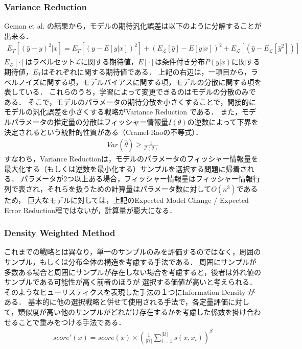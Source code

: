 \subsubsection{Variance Reduction \cite{cohn1994improving}}
Geman et al. \cite{geman2008neural}の結果から，モデルの期待汎化誤差は以下のように分解することが出来る．
\begin{eqnarray}
    E_T [(\hat{y} - y)^2|x] = E_T [(y - E[y|x])^2] + (E_{\mathcal{L}}[\hat{y}] - E[y|x])^2 + E_{\mathcal{L}} [(\hat{y} - E_{\mathcal{L}}[\hat{y}^2])]
\end{eqnarray}
$E_{\mathcal{L}}[\cdot]$はラベルセット$\mathcal{L}$に関する期待値，$E[\cdot]$は条件付き分布$P(y|x)$に関する期待値，$E_T$はそれぞれに関する期待値である．
上記の右辺は，一項目から，ラベルノイズに関する項，モデルバイアスに関する項，モデルの分散に関する項を表している．
これらのうち，学習によって変更できるのはモデルの分散のみである．
そこで，モデルのパラメータの期待分散を小さくすることで，間接的にモデルの汎化誤差を小さくする戦略がVariance Reduction \cite{cohn1994improving}である．
また，モデルパラメータの推定量の分散はフィッシャー情報量$I(\theta)$の逆数によって下界を決定されるという統計的性質がある（Cramel-Raoの不等式）．
\begin{eqnarray}
    Var(\hat{\theta}) \geq \frac{1}{\mathcal{I(\theta)}}
\end{eqnarray}
すなわち，Variance Reductionは，モデルのパラメータのフィッシャー情報量を最大化する（もしくは逆数を最小化する）サンプルを選択する問題に帰着される．
パラメータが2つ以上ある場合，フィッシャー情報量はフィッシャー情報行列で表され，それらを扱うための計算量はパラメータ数に対して$O(n^3)$であるため，
巨大なモデルに対しては，上記のExpected Model Change / Expected Error Reduction程ではないが，計算量が膨大になる．

\subsubsection{Density Weighted Method}
これまでの戦略とは異なり，単一のサンプルのみを評価するのではなく，周囲のサンプル，もしくは分布全体の構造を考慮する手法である．
周囲にサンプルが多数ある場合と周囲にサンプルが存在しない場合を考慮すると，後者は外れ値のサンプルである可能性が高く前者のほうが
選択する価値が高いと考えられる．
そのようなヒューリスティクスを表現した手法の１つにInformation Density \cite{settles2008analysis}がある．
基本的に他の選択戦略と併せて使用される手法で，各定量評価に対して，類似度が高い他のサンプルがどれだけ存在するかを考慮した係数を掛け合わせることで重みをつける手法である．
\begin{eqnarray}
    score'(x) = score(x) \times (\frac{1}{|\mathcal{U}|} \sum_{i=1}^{|\mathcal{U}|} s(x, x_i))^{\beta}
\end{eqnarray}

